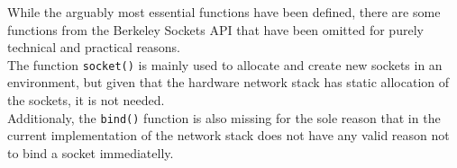 While the arguably most essential functions have been defined, there are some
functions from the Berkeley Sockets API that have been omitted for purely
technical and practical reasons.\\
The function \texttt{socket()} is mainly used to allocate and create new sockets
in an environment, but given that the hardware network stack has static allocation
of the sockets, it is not needed.\\
Additionaly, the \texttt{bind()} function is also missing for the sole reason
that in the current implementation of the network stack does not have any valid
reason not to bind a socket immediatelly.



